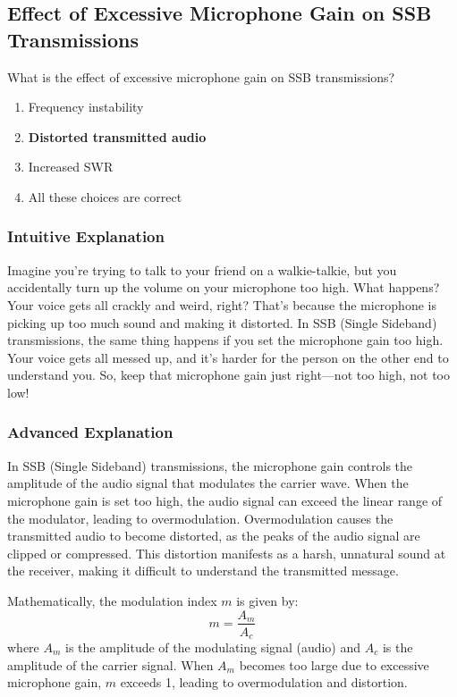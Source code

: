 \subsection{Effect of Excessive Microphone Gain on SSB Transmissions}
\label{T4B01}

\begin{tcolorbox}[colback=gray!10!white,colframe=black!75!black,title=T4B01]
What is the effect of excessive microphone gain on SSB transmissions?
\begin{enumerate}[label=\Alph*)]
    \item Frequency instability
    \item \textbf{Distorted transmitted audio}
    \item Increased SWR
    \item All these choices are correct
\end{enumerate}
\end{tcolorbox}

\subsubsection{Intuitive Explanation}
Imagine you're trying to talk to your friend on a walkie-talkie, but you accidentally turn up the volume on your microphone too high. What happens? Your voice gets all crackly and weird, right? That's because the microphone is picking up too much sound and making it distorted. In SSB (Single Sideband) transmissions, the same thing happens if you set the microphone gain too high. Your voice gets all messed up, and it’s harder for the person on the other end to understand you. So, keep that microphone gain just right—not too high, not too low!

\subsubsection{Advanced Explanation}
In SSB (Single Sideband) transmissions, the microphone gain controls the amplitude of the audio signal that modulates the carrier wave. When the microphone gain is set too high, the audio signal can exceed the linear range of the modulator, leading to overmodulation. Overmodulation causes the transmitted audio to become distorted, as the peaks of the audio signal are clipped or compressed. This distortion manifests as a harsh, unnatural sound at the receiver, making it difficult to understand the transmitted message.

Mathematically, the modulation index \( m \) is given by:
\[
m = \frac{A_m}{A_c}
\]
where \( A_m \) is the amplitude of the modulating signal (audio) and \( A_c \) is the amplitude of the carrier signal. When \( A_m \) becomes too large due to excessive microphone gain, \( m \) exceeds 1, leading to overmodulation and distortion.

